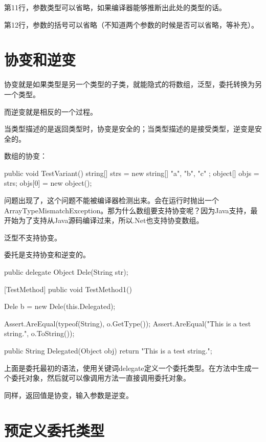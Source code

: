 第11行，参数类型可以省略，如果编译器能够推断出此处的类型的话。

第12行，参数的括号可以省略（不知道两个参数的时候是否可以省略，等补充）。


\section{协变和逆变}

协变就是如果类型是另一个类型的子类，就能隐式的将数组，泛型，委托转换为另一个类型。

而逆变就是相反的一个过程。

当类型描述的是返回类型时，协变是安全的；当类型描述的是接受类型，逆变是安全的。

数组的协变：

\begin{CSharp}
        public void TestVariant()
        {
            string[] strs = new string[] { "a", "b", "c" };
            object[] objs = strs;
            objs[0] = new object();
        }
\end{CSharp}

问题出现了，这个问题不能被编译器检测出来。会在运行时抛出一个ArrayTypeMismatchException。那为什么数组要支持协变呢？因为Java支持，最开始为了支持从Java源码编译过来，所以.Net也支持协变数组。

泛型不支持协变。

委托是支持协变和逆变的。

\begin{CSharp}[协变和逆变]
        
        public delegate Object Dele(String str);

        [TestMethod]
        public void TestMethod1()
        {
            Dele b = new Dele(this.Delegated);

            Assert.AreEqual(typeof(String), o.GetType());
            Assert.AreEqual("This is a test string.", o.ToString());            
        }

        public String Delegated(Object obj) { return "This is a test string.";}
\end{CSharp}

上面是委托最初的语法，使用关键词delegate定义一个委托类型。在方法中生成一个委托对象，然后就可以像调用方法一直接调用委托对象。

同样，返回值是协变，输入参数是逆变。


\section{预定义委托类型}

